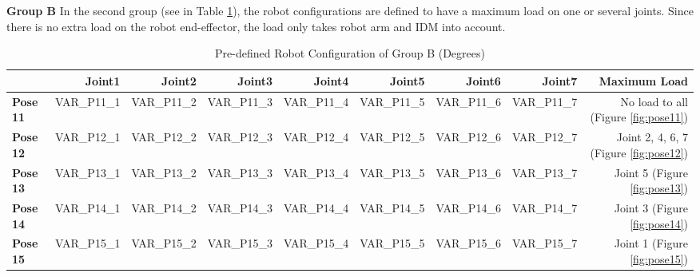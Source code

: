 \textbf{Group B}
In the second group (see in Table \ref{table-groupB}), the robot configurations are defined to have a maximum load on one or several joints. Since there is no extra load on the robot end-effector, the load only takes robot arm and IDM into account. 


\begin{table}[]
	\centering
	\caption{Pre-defined Robot Configuration of Group B (Degrees)}
	\label{table-groupB}
	\begin{tabular}{|l|r|r|r|r|r|r|r|r|}
		\hline
		\textbf{}  & \textbf{Joint1} & \textbf{Joint2} & \textbf{Joint3} & \textbf{Joint4} & \textbf{Joint5} & \textbf{Joint6} & \textbf{Joint7} & \textbf{Maximum Load} \\ \hline
		\textbf{Pose 11} & VAR_P11_1   & VAR_P11_2   & VAR_P11_3    & VAR_P11_4   & VAR_P11_5   & VAR_P11_6   & VAR_P11_7   & No load to all (Figure \ref{fig:pose11})   \\ \hline
		\textbf{Pose 12} & VAR_P12_1   & VAR_P12_2   & VAR_P12_3    & VAR_P12_4   & VAR_P12_5   & VAR_P12_6   & VAR_P12_7   & Joint 2, 4, 6, 7 (Figure \ref{fig:pose12}) \\ \hline
		\textbf{Pose 13} & VAR_P13_1   & VAR_P13_2   & VAR_P13_3    & VAR_P13_4   & VAR_P13_5   & VAR_P13_6   & VAR_P13_7   & Joint 5 (Figure \ref{fig:pose13})      \\ \hline
		\textbf{Pose 14} & VAR_P14_1   & VAR_P14_2   & VAR_P14_3    & VAR_P14_4   & VAR_P14_5   & VAR_P14_6   & VAR_P14_7   & Joint 3 (Figure \ref{fig:pose14})      \\ \hline
		\textbf{Pose 15} & VAR_P15_1   & VAR_P15_2   & VAR_P15_3    & VAR_P15_4   & VAR_P15_5   & VAR_P15_6   & VAR_P15_7   & Joint 1 (Figure \ref{fig:pose15})      \\ \hline
	\end{tabular}
\end{table}


